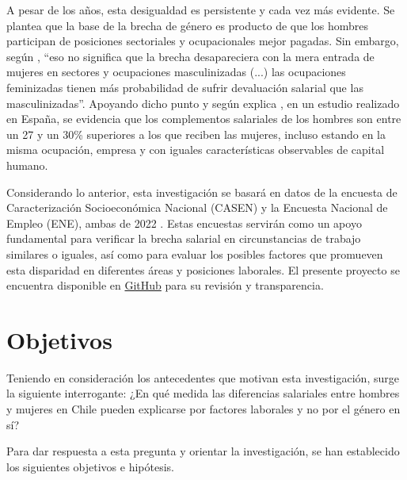 
A pesar de los años, esta desigualdad es persistente y cada vez más evidente. Se plantea que la base de la brecha de género es producto de que los hombres participan de posiciones sectoriales y ocupacionales mejor pagadas. Sin embargo, según \citet[pp. 333]{Ibanez2022}, ``eso no significa que la brecha desapareciera con la mera entrada de mujeres en sectores y ocupaciones masculinizadas (...) las ocupaciones feminizadas tienen más probabilidad de sufrir devaluación salarial que las masculinizadas''. Apoyando dicho punto y según explica \citet{Villar2010}, en un estudio realizado en España, se evidencia que los complementos salariales de los hombres son entre un 27 y un 30\% superiores a los que reciben las mujeres, incluso estando en la misma ocupación, empresa y con iguales características observables de capital humano.

Considerando lo anterior, esta investigación se basará en datos de la encuesta de Caracterización Socioeconómica Nacional (CASEN) y la Encuesta Nacional de Empleo (ENE), ambas de 2022 \citep{CASEN2022, ENE2022}. Estas encuestas servirán como un apoyo fundamental para verificar la brecha salarial en circunstancias de trabajo similares o iguales, así como para evaluar los posibles factores que promueven esta disparidad en diferentes áreas y posiciones laborales. El presente proyecto se encuentra disponible en \href{https://github.com/ElK1000o/Taller-Ciencia-de-Datos-II/tree/main/Proyecto}{GitHub} para su revisión y transparencia.

\section{Objetivos}


Teniendo en consideración los antecedentes que motivan esta investigación, surge la siguiente interrogante: ¿En qué medida las diferencias salariales entre hombres y mujeres en Chile pueden explicarse por factores laborales y no por el género en sí?

Para dar respuesta a esta pregunta y orientar la investigación, se han establecido los siguientes objetivos e hipótesis.

